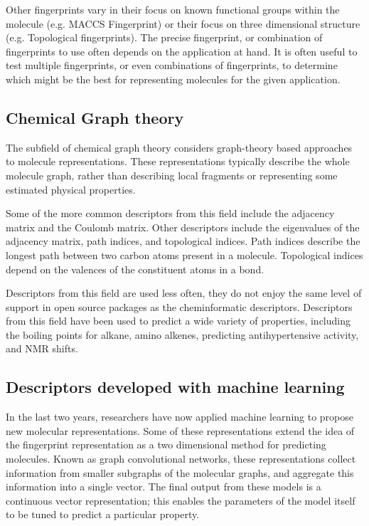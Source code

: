 Other fingerprints vary in their focus on known functional groups within the molecule (e.g. MACCS Fingerprint)\cite{durant2002reoptimization} or their focus on three dimensional structure (e.g. Topological fingerprints)\cite{nilakantan1987topological}. The precise fingerprint, or combination of fingerprints to use often depends on the application at hand. It is often useful to test multiple fingerprints, or even combinations of fingerprints, to determine which might be the best for representing molecules for the given application\cite{kim2017multidk}.


\subsection{Chemical Graph theory}

The subfield of chemical graph theory considers graph-theory based approaches to molecule representations\cite{randic2016solved}. These representations typically describe the whole molecule graph, rather than describing local fragments or representing some estimated physical properties.

Some of the more common descriptors from this field include the adjacency matrix and the Coulomb matrix\cite{rupp2012fast}. Other descriptors include the eigenvalues of the adjacency matrix, path indices, and topological indices. Path indices describe the longest path between two carbon atoms present in a molecule\cite{randic2016solved}.
Topological indices depend on the valences of the constituent atoms in a bond\cite{randic2016solved}.

Descriptors from this field are used less often, they do not enjoy the same level of support in open source packages as the cheminformatic descriptors. Descriptors from this field have been used to predict a wide variety of properties, including the boiling points for alkane, amino alkenes, predicting antihypertensive activity, and NMR shifts\cite{randic2016solved}.

\subsection{Descriptors developed with machine learning}

In the last two years, researchers have now applied machine learning to propose new molecular representations. Some of these representations extend the idea of the fingerprint representation as a two dimensional method for predicting molecules.
Known as graph convolutional networks\cite{duvenaud2015convolutional,kearnes2016molecular,gilmer_2017_mpnn}, these representations collect information from smaller subgraphs of the molecular graphs, and aggregate this information into a single vector.
The final output from these models is a continuous vector representation; this enables the parameters of the model itself to be tuned to predict a particular property.

